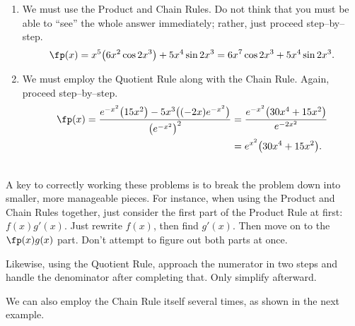 {
\begin{enumerate}
\item		We must use the Product and Chain Rules. Do not think that you must be able to ``see'' the whole answer immediately; rather, just proceed step--by--step.
		$$\fp(x) = x^5\big(6x^2\cos 2x^3\big) + 5x^4\sin 2x^3= 6x^7\cos2x^3+5x^4\sin 2x^3.$$
\item		We must employ the Quotient Rule along with the Chain Rule. Again, proceed step--by--step.
\begin{align*}
\fp(x) = \frac{e^{-x^2}\big(15x^2\big) - 5x^3\big((-2x)e^{-x^2}\big)}{\big(e^{-x^2}\big)^2} &=\frac{e^{-x^2}\big(30x^4+15x^2\big)}{e^{-2x^2}}\\
 &= e^{x^2}\big(30x^4+15x^2\big).
\end{align*}
\end{enumerate}
\baselineskip
}\\

A key to correctly working these problems is to break the problem down into smaller, more manageable pieces. For instance, when using the Product and Chain Rules together, just consider the first part of the Product Rule at first: $f(x)g'(x)$. Just rewrite $f(x)$, then find $g'(x)$. Then move on to the $\fp(x)g(x)$ part. Don't attempt to figure out both parts at once.

Likewise, using the Quotient Rule, approach the numerator in two steps and handle the denominator after completing that. Only simplify afterward.

We can also employ the Chain Rule itself several times, as shown in the next example.\\

